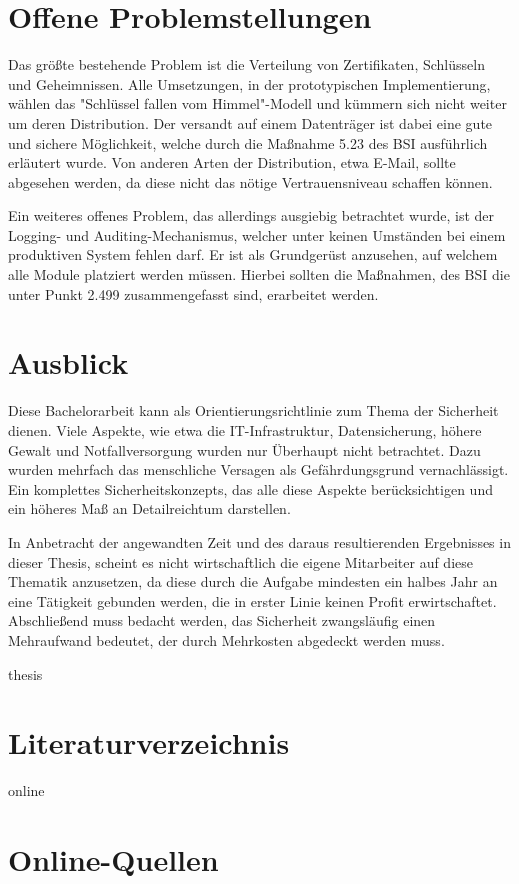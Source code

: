 \documentclass[11pt,a4paper]{report}
\begin{document}
\section{Offene Problemstellungen}

Das größte bestehende Problem ist die Verteilung von Zertifikaten, Schlüsseln und Geheimnissen. Alle Umsetzungen, in der prototypischen Implementierung, wählen das "Schlüssel fallen vom Himmel"-Modell und kümmern sich nicht weiter um deren Distribution. Der versandt auf einem Datenträger ist dabei eine gute und sichere Möglichkeit, welche durch die Maßnahme 5.23 des BSI ausführlich erläutert wurde. Von anderen Arten der Distribution, etwa E-Mail, sollte abgesehen werden, da diese nicht das nötige Vertrauensniveau schaffen können.

Ein weiteres offenes Problem, das allerdings ausgiebig betrachtet wurde, ist der Logging- und Auditing-Mechanismus, welcher unter keinen Umständen bei einem produktiven System fehlen darf. Er ist als Grundgerüst anzusehen, auf welchem alle Module platziert werden müssen. Hierbei sollten die Maßnahmen, des BSI die unter Punkt 2.499 \cite{bsi_m2499} zusammengefasst sind, erarbeitet werden.

\section{Ausblick}

Diese Bachelorarbeit kann als Orientierungsrichtlinie zum Thema der Sicherheit dienen. Viele Aspekte, wie etwa die IT-Infrastruktur, Datensicherung, höhere Gewalt und Notfallversorgung wurden nur Überhaupt nicht betrachtet. Dazu wurden mehrfach das menschliche Versagen als Gefährdungsgrund vernachlässigt. Ein komplettes Sicherheitskonzepts, das alle diese Aspekte berücksichtigen und ein höheres Maß an Detailreichtum darstellen.

In Anbetracht der angewandten Zeit und des daraus resultierenden Ergebnisses in dieser Thesis, scheint es nicht wirtschaftlich die eigene Mitarbeiter auf diese Thematik anzusetzen, da diese durch die Aufgabe mindesten ein halbes Jahr an eine Tätigkeit gebunden werden, die in erster Linie keinen Profit erwirtschaftet. Abschließend muss bedacht werden, das Sicherheit zwangsläufig einen Mehraufwand bedeutet, der durch Mehrkosten abgedeckt werden muss.

\newpage


\begin{btSect}{thesis} %
\section*{Literaturverzeichnis}
\btPrintCited
\end{btSect}
\begin{btSect}{online}
\section*{Online-Quellen}
\btPrintCited
\end{btSect}
\end{document}
